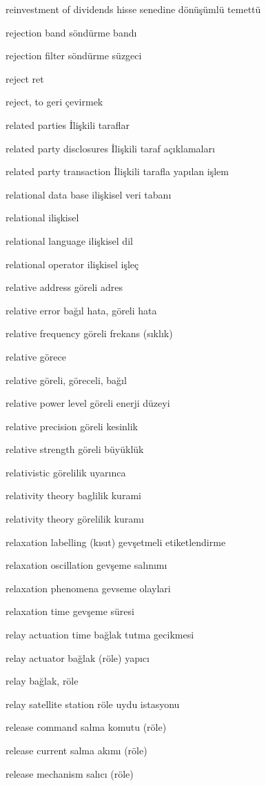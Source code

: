 \documentclass[12pt,fleqn]{article}\usepackage{../../common}
\begin{document}
reinvestment of dividends hisse senedine dönüşümlü temettü

rejection band söndürme bandı

rejection filter söndürme süzgeci

reject ret

reject, to geri çevirmek

related parties İlişkili taraflar

related party disclosures İlişkili taraf açıklamaları

related party transaction İlişkili tarafla yapılan işlem

relational data base ilişkisel veri tabanı

relational ilişkisel

relational language ilişkisel dil

relational operator ilişkisel işleç

relative address göreli adres

relative error bağıl hata, göreli hata

relative frequency göreli frekans (sıklık)

relative görece

relative göreli, göreceli, bağıl

relative power level göreli enerji düzeyi

relative precision göreli kesinlik

relative strength göreli büyüklük

relativistic görelilik uyarınca

relativity theory baglilik kurami

relativity theory görelilik kuramı

relaxation labelling (kısıt) gevşetmeli etiketlendirme

relaxation oscillation gevşeme salınımı

relaxation phenomena gevseme olaylari

relaxation time gevşeme süresi

relay actuation time bağlak tutma gecikmesi

relay actuator bağlak (röle) yapıcı

relay bağlak, röle

relay satellite station röle uydu istasyonu

release command salma komutu (röle)

release current salma akımı (röle)

release mechanism salıcı (röle)
\end{document}
